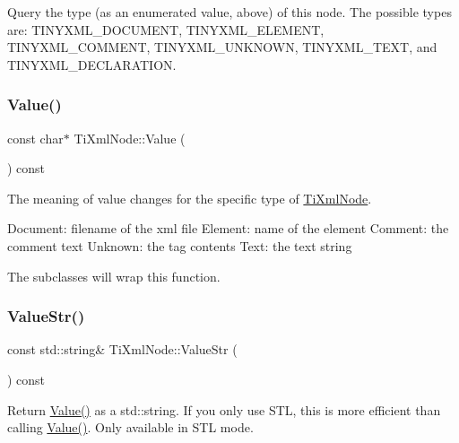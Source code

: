 Query the type (as an enumerated value, above) of this node. The possible types are\+: T\+I\+N\+Y\+X\+M\+L\+\_\+\+D\+O\+C\+U\+M\+E\+NT, T\+I\+N\+Y\+X\+M\+L\+\_\+\+E\+L\+E\+M\+E\+NT, T\+I\+N\+Y\+X\+M\+L\+\_\+\+C\+O\+M\+M\+E\+NT, T\+I\+N\+Y\+X\+M\+L\+\_\+\+U\+N\+K\+N\+O\+WN, T\+I\+N\+Y\+X\+M\+L\+\_\+\+T\+E\+XT, and T\+I\+N\+Y\+X\+M\+L\+\_\+\+D\+E\+C\+L\+A\+R\+A\+T\+I\+ON. \hypertarget{class_ti_xml_node_ad44dfe927d49a74dd78b72b7514417ad}{}\label{class_ti_xml_node_ad44dfe927d49a74dd78b72b7514417ad} 
\subsubsection{\texorpdfstring{Value()}{Value()}}
{\footnotesize\ttfamily const char$\ast$ Ti\+Xml\+Node\+::\+Value (\begin{DoxyParamCaption}{ }\end{DoxyParamCaption}) const\hspace{0.3cm}{\ttfamily [inline]}}

The meaning of \textquotesingle{}value\textquotesingle{} changes for the specific type of \hyperlink{class_ti_xml_node}{Ti\+Xml\+Node}. \begin{DoxyVerb}Document:   filename of the xml file
Element:    name of the element
Comment:    the comment text
Unknown:    the tag contents
Text:       the text string
\end{DoxyVerb}


The subclasses will wrap this function. \hypertarget{class_ti_xml_node_a74bda074919e4a5e08d700204793f898}{}\label{class_ti_xml_node_a74bda074919e4a5e08d700204793f898} 
\subsubsection{\texorpdfstring{Value\+Str()}{ValueStr()}}
{\footnotesize\ttfamily const std\+::string\& Ti\+Xml\+Node\+::\+Value\+Str (\begin{DoxyParamCaption}{ }\end{DoxyParamCaption}) const\hspace{0.3cm}{\ttfamily [inline]}}

Return \hyperlink{class_ti_xml_node_ad44dfe927d49a74dd78b72b7514417ad}{Value()} as a std\+::string. If you only use S\+TL, this is more efficient than calling \hyperlink{class_ti_xml_node_ad44dfe927d49a74dd78b72b7514417ad}{Value()}. Only available in S\+TL mode. 


